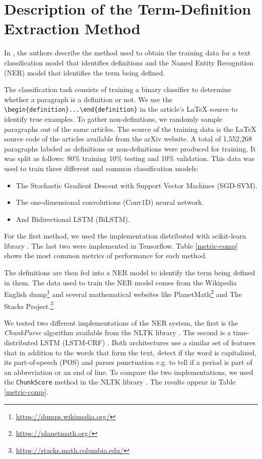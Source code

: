 \documentclass[submission,copyright,creativecommons]{eptcs}
\begin{document}
\section{Description of the Term-Definition Extraction Method}
In \cite{DBLP:conf/mkm/Berlioz19, Deyan1}, the authors describe the 
method used  to obtain the training data for a text classification
model that identifies definitions and the Named Entity Recognition (NER) model that identifies the term being defined. 

The classification task consists of training a binary classifier to determine whether a paragraph is a definition or not. We use the \verb/\begin{definition}...\end{definition}/ in the article's \LaTeX{} source to identify true examples. To gather non-definitions, we randomly sample paragraphs out of the same articles.
The source of the training data is the \LaTeX{} source code of the articles available from the arXiv website. A total of 1,552,268 paragraphs labeled as definitions or non-definitions were produced for training. It was split as follows: 80\% training 10\% testing and 10\% validation. This data was used to train three different and common classification models:
\begin{itemize}
    \item The Stochastic Gradient Descent with Support Vector Machines (SGD-SVM). 
    \item The one-dimensional convolutions (Conv1D) neural network.
    \item And Bidirectional LSTM (BiLSTM). 
\end{itemize}
For the first method, we used the implementation distributed with scikit-learn library \cite{DBLP:journals/jmlr/PedregosaVGMTGBPWDVPCBPD11}. The last two were implemented in Tensorflow. Table \ref{metric-comp} shows the most common metrics of performance for each method. 

The definitions are then fed into a NER model to identify the term being defined in them.
The data used to train the NER model comes from the Wikipedia English dump\footnote{\url{https://dumps.wikimedia.org/}} and several mathematical websites like
PlanetMath\footnote{\url{https://planetmath.org/}} and The Stacks
Project.\footnote{\url{https://stacks.math.columbia.edu/}}

We tested two different implementations of the NER system, the first is the \emph{ChunkParse} algorithm available from the NLTK library \cite{DBLP:books/daglib/0022921}. The second is a time-distributed LSTM (LSTM-CRF) \cite{DBLP:journals/corr/HuangXY15}. Both architectures use a similar set of features that in addition to the words that form the text, detect if the word is capitalized, its part-of-speech (POS) and parses punctuation e.g. to tell if a period is part of an abbreviation or an end of line.
To compare the two implementations, we used the \texttt{ChunkScore} method in
the NLTK library \cite{DBLP:books/daglib/0022921}. The results appear in Table \ref{metric-comp}. 
\end{document}
